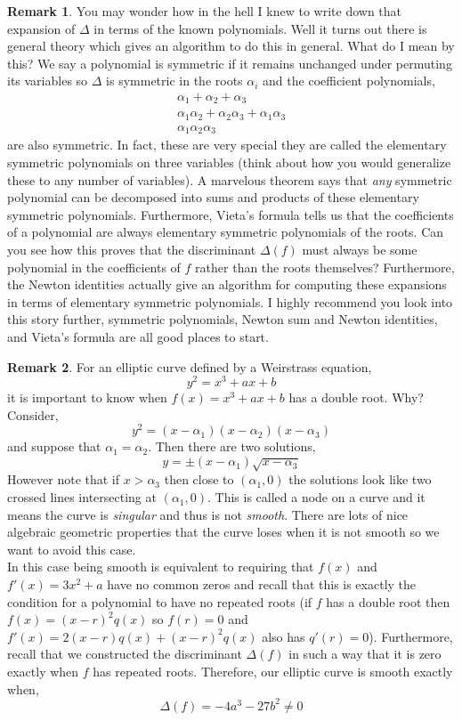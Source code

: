 \documentclass{article}
\theoremstyle{definition}
\newtheorem{remark}{Remark}[section]
\begin{document}
\begin{remark}
You may wonder how in the hell I knew to write down that expansion of $\Delta$ in terms of the known polynomials. Well it turns out there is general theory which gives an algorithm to do this in general. What do I mean by this? We say a polynomial is symmetric if it remains unchanged under permuting its variables so $\Delta$ is symmetric in the roots $\alpha_i$ and the coefficient polynomials,
\begin{align*}
\alpha_1 + \alpha_2 + \alpha_3
\\
\alpha_1 \alpha_2 + \alpha_2 \alpha_3 + \alpha_1 \alpha_3
\\
\alpha_1 \alpha_2 \alpha_3
\end{align*}
are also symmetric. In fact, these are very special they are called the elementary symmetric polynomials on three variables (think about how you would generalize these to any number of variables). A marvelous theorem says that \textit{any} symmetric polynomial can be decomposed into sums and products of these elementary symmetric polynomials. Furthermore, Vieta's formula tells us that the coefficients of a polynomial are always elementary symmetric polynomials of the roots. Can you see how this proves that the discriminant $\Delta(f)$ must always be some polynomial in the coefficients of $f$ rather than the roots themselves?  Furthermore, the Newton identities actually give an algorithm for computing these expansions in terms of elementary symmetric polynomials. I highly recommend you look into this story further, symmetric polynomials, Newton sum and Newton identities, and Vieta's formula are all good places to start.  
\end{remark}

\begin{remark}
For an elliptic curve defined by a Weirstrass equation,
\[ y^2 = x^3 + a x + b \]
it is important to know when $f(x) = x^3 + a x + b$ has a double root. Why? Consider,
\[ y^2 = (x - \alpha_1)(x - \alpha_2)(x - \alpha_3) \]
and suppose that $\alpha_1 = \alpha_2$. Then there are two solutions,
\[ y = \pm (x - \alpha_1) \sqrt{x - \alpha_3} \]
However note that if $x > \alpha_3$ then close to $(\alpha_1, 0)$ the solutions look like two crossed lines intersecting at $(\alpha_1, 0)$. This is called a node on a curve and it means the curve is \textit{singular} and thus is not \textit{smooth}. There are lots of nice algebraic geometric properties that the curve loses when it is not smooth so we want to avoid this case. 
\bigskip\\
In this case being smooth is equivalent to requiring that $f(x)$ and $f'(x) = 3 x^2 + a$ have no common zeros and recall that this is exactly the condition for a polynomial to have no repeated roots (if $f$ has a double root then $f(x) = (x - r)^2 q(x)$ so $f(r) = 0$ and $f'(x) = 2 (x - r) q(x) + (x - r)^2 q(x)$ also has $q'(r) = 0$). Furthermore, recall that we constructed the discriminant $\Delta(f)$ in such a way that it is zero exactly when $f$ has repeated roots. Therefore, our elliptic curve is smooth exactly when,
\[ \Delta(f) = - 4 a^3 - 27 b^2 \neq 0 \]
\end{remark}
\end{document}
